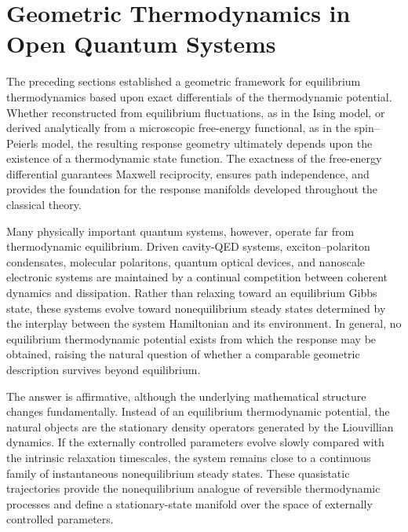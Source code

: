 \section{Geometric Thermodynamics in Open Quantum Systems}
\label{sec:oqs}
The preceding sections established a geometric framework for
equilibrium thermodynamics based upon exact differentials of the
thermodynamic potential. Whether reconstructed from equilibrium
fluctuations, as in the Ising model, or derived analytically from
a microscopic free-energy functional, as in the spin--Peierls
model, the resulting response geometry ultimately depends upon
the existence of a thermodynamic state function. The exactness of
the free-energy differential guarantees Maxwell reciprocity,
ensures path independence, and provides the foundation for the
response manifolds developed throughout the classical theory.

Many physically important quantum systems, however, operate far
from thermodynamic equilibrium. Driven cavity-QED systems,
exciton--polariton condensates, molecular polaritons, quantum
optical devices, and nanoscale electronic systems are maintained
by a continual competition between coherent dynamics and
dissipation. Rather than relaxing toward an equilibrium Gibbs
state, these systems evolve toward nonequilibrium steady states
determined by the interplay between the system Hamiltonian and
its environment. In general, no equilibrium thermodynamic
potential exists from which the response may be obtained,
raising the natural question of whether a comparable geometric
description survives beyond equilibrium.

The answer is affirmative, although the underlying mathematical
structure changes fundamentally. Instead of an equilibrium
thermodynamic potential, the natural objects are the stationary
density operators generated by the Liouvillian dynamics. If the
externally controlled parameters evolve slowly compared with the
intrinsic relaxation timescales, the system remains close to a
continuous family of instantaneous nonequilibrium steady states.
These quasistatic trajectories provide the nonequilibrium
analogue of reversible thermodynamic processes and define a
stationary-state manifold over the space of externally controlled
parameters.

